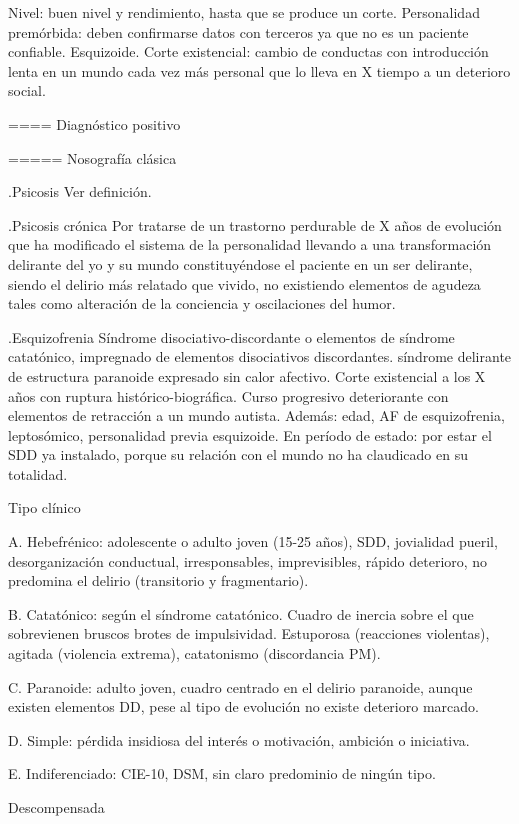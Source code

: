 \documentclass[encares.tex]{subfiles}
\begin{document}
Nivel: buen nivel y rendimiento, hasta que se produce un corte. Personalidad premórbida: deben confirmarse datos con terceros ya que no es un paciente confiable. Esquizoide. Corte existencial: cambio de conductas con introducción lenta en un mundo cada vez más personal que lo lleva en X tiempo a un deterioro social.

==== Diagnóstico positivo

===== Nosografía clásica

.Psicosis
Ver definición.

.Psicosis crónica
Por tratarse de un trastorno perdurable de X años de evolución que ha modificado el sistema de la personalidad llevando a una transformación delirante del yo y su mundo constituyéndose el paciente en un ser delirante, siendo el delirio más relatado que vivido, no existiendo elementos de agudeza tales como alteración de la conciencia y oscilaciones del humor.

.Esquizofrenia
Síndrome disociativo-discordante o elementos de síndrome catatónico, impregnado de elementos disociativos discordantes. síndrome delirante de estructura paranoide expresado sin calor afectivo. Corte existencial a los X años con ruptura histórico-biográfica. Curso progresivo deteriorante con elementos de retracción a un mundo autista. Además: edad, AF de esquizofrenia, leptosómico, personalidad previa esquizoide. En período de estado: por estar el SDD ya instalado, porque su relación con el mundo no ha claudicado en su totalidad.

Tipo clínico

A. Hebefrénico: adolescente o adulto joven (15-25 años), SDD, jovialidad pueril, desorganización conductual, irresponsables, imprevisibles, rápido deterioro, no predomina el delirio (transitorio y fragmentario).

B. Catatónico: según el síndrome catatónico. Cuadro de inercia sobre el que sobrevienen bruscos brotes de impulsividad. Estuporosa (reacciones violentas), agitada (violencia extrema), catatonismo (discordancia PM).

C. Paranoide: adulto joven, cuadro centrado en el delirio paranoide, aunque existen elementos DD, pese al tipo de evolución no existe deterioro marcado.

D. Simple: pérdida insidiosa del interés o motivación, ambición o iniciativa.

E. Indiferenciado: CIE-10, DSM, sin claro predominio de ningún tipo.

Descompensada
\end{document}
